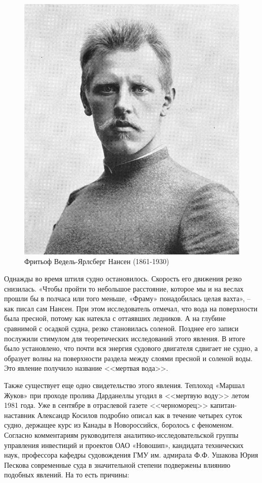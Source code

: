 \begin{figure}
    \centering
    \includegraphics[scale=2.5]{Figs/800px-Fridtjof_Nansen.jpg}
    \caption{Фритьоф Ведель-Ярлсберг Нансен (1861-1930)}
    \label{fig:Nansen}
\end{figure}

Однажды во время штиля судно остановилось. Скорость его движения резко снизилась.  «Чтобы пройти то небольшое расстояние, которое мы и на веслах прошли бы в полчаса или того меньше, «Фраму» понадобилась целая вахта», -- как писал сам Нансен. При этом исследователь отмечал, что вода на поверхности была пресной, потому как натекла с оттаявших ледников. А на глубине сравнимой с осадкой судна, резко становилась соленой. Позднее его записи послужили стимулом для теоретических исследований этого явления. В итоге было установлено, что почти вся энергия судового двигателя сдвигает не судно, а образует волны на поверхности раздела между слоями пресной и соленой воды. Это явление получило название <<мертвая вода>>.

Также существует еще одно свидетельство этого явления. Теплоход «Маршал Жуков» при проходе пролива Дарданеллы угодил в <<мертвую воду>> летом 1981 года. Уже в сентябре в отраслевой газете <<черноморец>> капитан-наставник Александр Косилов подробно описал как в течение четырех суток судно, держащее курс из Канады в Новороссийск, боролось с феноменом. Согласно комментариям руководителя аналитико-исследовательской группы управления инвестиций и проектов ОАО «Новошип», кандидата технических наук, профессора кафедры судовождения ГМУ им. адмирала Ф.Ф. Ушакова Юрия Пескова современные суда в значительной степени подвержены влиянию подобных явлений\cite{MorVest}. На то есть причины:

